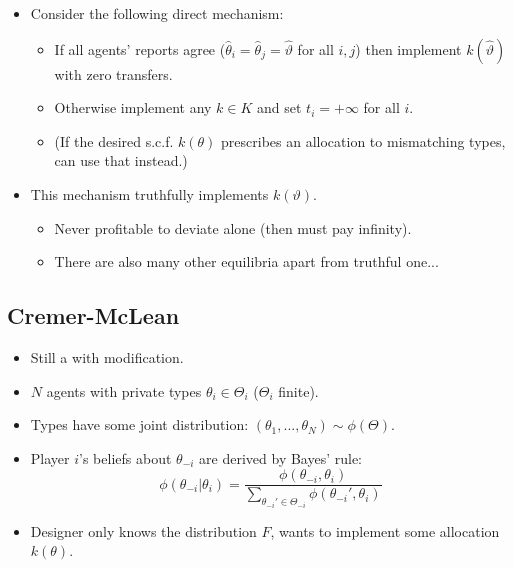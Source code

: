 \documentclass[english,handout]{beamer}		%
\def\lyxframeend{} %
\begin{document}
\begin{itemize}
	\item Consider the following direct mechanism:
	\begin{itemize}
		\item If all agents' reports agree ($\hat{\theta}_i=\hat{\theta}_j=\hat{\vartheta}$ for all $i,j$) then implement $k(\hat{\vartheta})$ with zero transfers.
		\item Otherwise implement any $k \in K$ and set $t_i = +\infty$ for all $i$.
		\item (If the desired s.c.f. $k(\theta)$ prescribes an allocation to mismatching types, can use that instead.)
	\end{itemize}
	\item This mechanism truthfully implements $k(\vartheta)$.
	\begin{itemize}
		\item Never profitable to deviate alone (then must pay infinity).
		\item There are also many other equilibria apart from truthful one...
	\end{itemize}
\end{itemize}
\lyxframeend


\subsection{Cremer-McLean}

\begin{itemize}
	\item Still a  with modification.
	\item $N$ agents with private types $\theta_i \in \Theta_i$ ($\Theta_i$ finite).
	\item Types have some joint distribution: $(\theta_1,...,\theta_N) \sim \phi(\Theta)$.
	\item Player $i$'s beliefs about $\theta_{-i}$ are derived by Bayes' rule:
		$$\phi(\theta_{-i}|\theta_i) = \frac{\phi(\theta_{-i},\theta_i)}{\sum_{\theta_{-i}' \in \Theta_{-i}} \phi(\theta_{-i}',\theta_i)} $$
	\item Designer only knows the distribution $F$, wants to implement some allocation $k(\theta)$.
\end{itemize}
\lyxframeend
\end{document}
